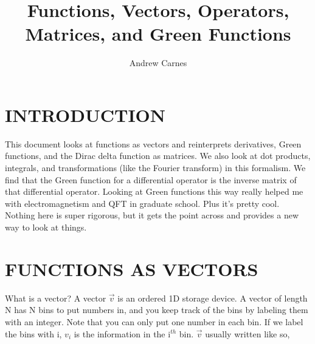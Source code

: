 \documentclass[12pt]{article}
\begin{document}
\title{Functions, Vectors, Operators, Matrices, and Green Functions}
\author{Andrew Carnes}

\maketitle

\newpage
\tableofcontents
\newpage

\section{INTRODUCTION} \label{intro}

This document looks at functions as vectors and reinterprets derivatives, Green functions, and the Dirac delta function as matrices. We also look at dot products, integrals, and transformations (like the Fourier transform) in this formalism. We find that the Green function for a differential operator is the inverse matrix of that differential operator. Looking at Green functions this way really helped me with electromagnetism and QFT in graduate school. Plus it's pretty cool. Nothing here is super rigorous, but it gets the point across and provides a new way to look at things.

\section{FUNCTIONS AS VECTORS}  

What is a vector? A vector $\vec{v}$ is an ordered 1D storage device. A vector of length N has N bins to put numbers in, and you keep track of the bins by labeling them with an integer. Note that you can only put one number in each bin. If we label the bins with i, $v_i$ is the information in the i$^{th}$ bin. $\vec{v}$ usually written like so, 
\end{document}
